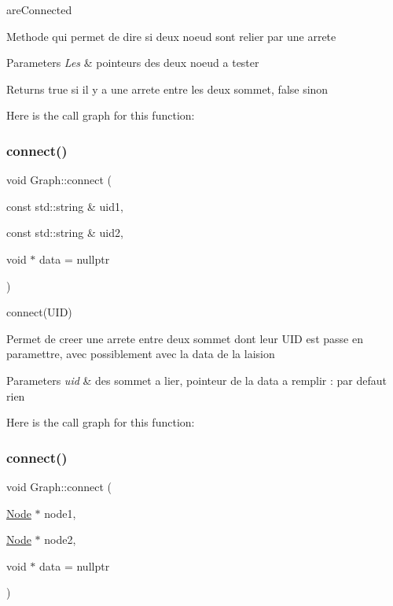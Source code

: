 are\+Connected 

Methode qui permet de dire si deux noeud sont relier par une arrete


\begin{DoxyParams}{Parameters}
{\em Les} & pointeurs des deux noeud a tester \\
\hline
\end{DoxyParams}
\begin{DoxyReturn}{Returns}
true si il y a une arrete entre les deux sommet, false sinon 
\end{DoxyReturn}
Here is the call graph for this function\+:
\mbox{\label{class_graph_a6f487be56c6a426443caa718e33c5399}} 
\subsubsection{\texorpdfstring{connect()}{connect()}\hspace{0.1cm}{\footnotesize\ttfamily [1/2]}}
{\footnotesize\ttfamily void Graph\+::connect (\begin{DoxyParamCaption}\item[{const std\+::string \&}]{uid1,  }\item[{const std\+::string \&}]{uid2,  }\item[{void $\ast$}]{data = {\ttfamily nullptr} }\end{DoxyParamCaption})}



connect(\+U\+I\+D) 

Permet de creer une arrete entre deux sommet dont leur U\+ID est passe en paramettre, avec possiblement avec la data de la laision


\begin{DoxyParams}{Parameters}
{\em uid} & des sommet a lier, pointeur de la data a remplir \+: par defaut rien \\
\hline
\end{DoxyParams}
Here is the call graph for this function\+:
\mbox{\label{class_graph_afedc0da07ed8ca06cf07f202dd83cec4}} 
\subsubsection{\texorpdfstring{connect()}{connect()}\hspace{0.1cm}{\footnotesize\ttfamily [2/2]}}
{\footnotesize\ttfamily void Graph\+::connect (\begin{DoxyParamCaption}\item[{\mbox{\hyperlink{class_node}{Node}} $\ast$}]{node1,  }\item[{\mbox{\hyperlink{class_node}{Node}} $\ast$}]{node2,  }\item[{void $\ast$}]{data = {\ttfamily nullptr} }\end{DoxyParamCaption})}



